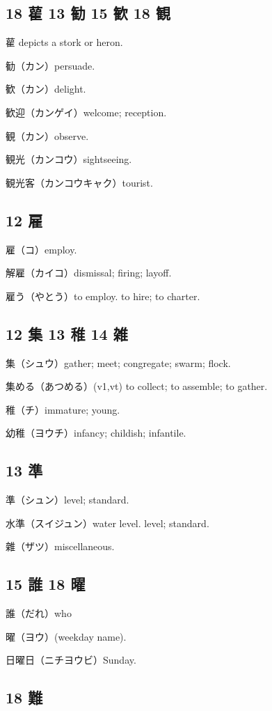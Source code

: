 \subsection{18 雚 13 勧 15 歓 18 観}

雚 depicts a stork or heron.

勧（カン）persuade.

歓（カン）delight.

歓迎（カンゲイ）welcome; reception.

観（カン）observe.

観光（カンコウ）sightseeing.

観光客（カンコウキャク）tourist.

\subsection{12 雇}

雇（コ）employ.

解雇（カイコ）dismissal; firing; layoff.

雇う（やとう）to employ. to hire; to charter.

\subsection{12 集 13 稚 14 雑}

集（シュウ）gather; meet; congregate; swarm; flock.

集める（あつめる）(v1,vt) to collect; to assemble; to gather.

稚（チ）immature; young.

幼稚（ヨウチ）infancy; childish; infantile.

\subsection{13 準}

準（シュン）level; standard.

水準（スイジュン）water level. level; standard.

雜（ザツ）miscellaneous.

\subsection{15 誰 18 曜}

誰（だれ）who

曜（ヨウ）(weekday name).

日曜日（ニチヨウビ）Sunday.

\subsection{18 難}

